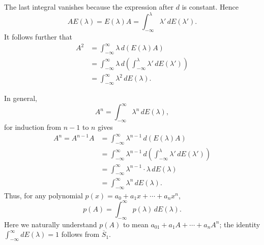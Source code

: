 \documentclass[fontsize=13pt,twoside,openany,headings=normal,parskip=false,bookmarkpackage=false,DIV=calc]{scrbook}
\begin{document}
The last integral vanishes because the expression after $d$ is constant. Hence
\[
AE(\lambda)=E(\lambda)A=\int_{-\infty}^{\lambda}\lambda'\,dE(\lambda').
\]
It follows further that
\begin{align*}
A^2&=\int_{-\infty}^{\infty}\lambda\,d(E(\lambda)A)\\
&=\int_{-\infty}^{\infty}\lambda\,d\left(\int_{-\infty}^{\lambda}\lambda'\,dE(\lambda')\right)\\
&=\int_{-\infty}^{\infty}\lambda^2\,dE(\lambda).
\end{align*}

\hypertarget{origpage-74}{}%
In general,
\[
A^n=\int_{-\infty}^{\infty}\lambda^n\,dE(\lambda),
\]
for induction from $n-1$ to $n$ gives
\begin{align*}
A^n=A^{n-1}A
&=\int_{-\infty}^{\infty}\lambda^{n-1}\,d(E(\lambda)A)\\
&=\int_{-\infty}^{\infty}\lambda^{n-1}\,d\left(\int_{-\infty}^{\lambda}\lambda'\,dE(\lambda')\right)\\
&=\int_{-\infty}^{\infty}\lambda^{n-1}\cdot\lambda\,dE(\lambda)\\
&=\int_{-\infty}^{\infty}\lambda^n\,dE(\lambda).
\end{align*}
Thus, for any polynomial $p(x)=a_0+a_1x+\cdots+a_nx^n$,
\[
p(A)=\int_{-\infty}^{\infty}p(\lambda)\,dE(\lambda).
\]
Here we naturally understand $p(A)$ to mean $a_01+a_1A+\cdots+a_nA^n$; the identity $\int_{-\infty}^{\infty}dE(\lambda)=1$ follows from $\hyperref[cond:II.Sbar1]{\overline{S}_1}$.
\end{document}
